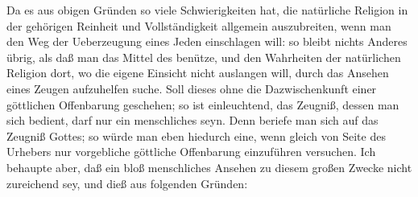 Da es aus obigen Gründen so viele Schwierigkeiten hat, die natürliche Religion in der gehörigen Reinheit und Vollständigkeit allgemein auszubreiten, wenn man den Weg der Ueberzeugung eines Jeden einschlagen will: so bleibt nichts Anderes übrig, als daß man das Mittel des  benütze, und den Wahrheiten der natürlichen Religion dort, wo die eigene Einsicht nicht auslangen will, durch das Ansehen eines Zeugen aufzuhelfen suche. Soll dieses ohne die Dazwischenkunft einer göttlichen Offenbarung geschehen; so ist einleuchtend, das Zeugniß, dessen man sich bedient, darf nur ein menschliches seyn. Denn beriefe man sich auf das Zeugniß Gottes; so würde man eben hiedurch eine, wenn gleich von Seite des Urhebers nur vorgebliche göttliche Offenbarung einzuführen versuchen. Ich behaupte aber, daß ein bloß menschliches Ansehen zu diesem großen Zwecke nicht zureichend sey, und dieß aus folgenden Gründen:~
